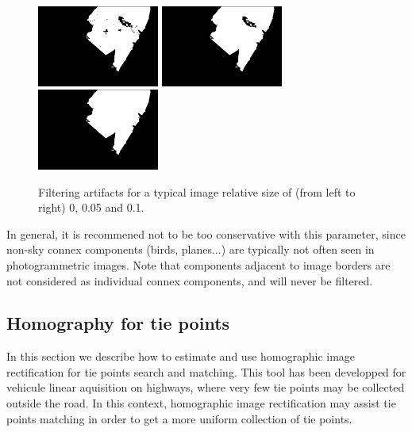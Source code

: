 \begin{itemize}
		\begin{figure}[!h]
		\begin{center}
			\includegraphics[width=40mm]{FIGS/SkyMask/im_px_0.JPG}
			\includegraphics[width=40mm]{FIGS/SkyMask/im_px_005.JPG}
			\includegraphics[width=40mm]{FIGS/SkyMask/im_px_01.JPG}
			\caption{Filtering artifacts for a typical image relative size of (from left to right) 0, 0.05 and 0.1.}
		\end{center}	
	\end{figure}

	In general, it is recommened not to be too conservative with this parameter, since non-sky connex components (birds, planes...) are typically not often seen in photogrammetric images. Note that components adjacent to image borders are not considered as individual connex components, and will never be filtered. \newline
	
\end{itemize}




\subsection{Homography for tie points}
\vspace{0.5cm}

\noindent In this section we describe how to estimate and use homographic image rectification for tie points search and matching. This tool has been developped for vehicule linear aquisition on highways, where very few tie points may be collected outside the road. In this context, homographic image rectification may assist tie points matching in order to get a more uniform collection of tie points. \newline

